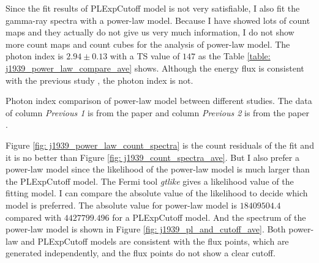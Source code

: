 \documentclass[12pt]{report}
\newcommand{\mycaption}[1]{\protect \caption{#1}}
\begin{document}
            Since the fit results of PLExpCutoff model is not very satisfiable, I also fit the 
            gamma-ray spectra with a power-law model. Because I have showed lots of count maps 
            and they actually do not give us very much information, I do not show more count maps 
            and count cubes for the analysis of power-law model. The photon index is 
            $2.94\pm0.13$ with a TS value of $147$ as the Table 
            \ref{table: j1939_power_law_compare_ave} shows. Although the energy flux is consistent 
            with the previous study \cite{0004-637X-787-2-167}, the photon index is not.
            \begin{table}[!htp]
              \centering
                \mycaption{Photon index comparison of power-law model between different 
                  studies. The data of column \textit{Previous 1} is from the paper 
                  \cite{0004-637X-787-2-167} and column \textit{Previous 2} is from the paper 
                  \cite{J1939_old}.}
                \label{table: j1939_power_law_compare_ave}        
            \end{table}  

            Figure \ref{fig: j1939_power_law_count_spectra} is the count residuals of the fit and 
            it is no better than Figure \ref{fig: j1939_count_spectra_ave}. But I also prefer a 
            power-law model since the likelihood of the power-law model is much larger than the 
            PLExpCutoff model. The Fermi tool \textit{gtlike} gives a likelihood value of the 
            fitting model. I can compare the absolute value of the likelihood to decide which model 
            is preferred. The absolute value for power-law model is $18409504.4$ compared with 
            $4427799.496$ for a PLExpCutoff model. And the spectrum of the power-law model is 
            shown in Figure \ref{fig: j1939_pl_and_cutoff_ave}. Both power-law and PLExpCutoff 
            models are consistent with the flux points, which are generated independently, and 
            the flux points do not show a clear cutoff. 
\end{document}
